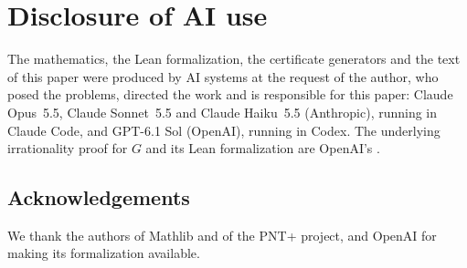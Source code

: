 \section*{Disclosure of AI use}

The mathematics, the Lean formalization, the certificate generators and the text of this paper were produced by AI systems at the request of the author, who posed the problems, directed the work and is responsible for this paper: Claude Opus~5.5, Claude Sonnet~5.5 and Claude Haiku~5.5 (Anthropic), running in Claude Code, and GPT-6.1 Sol (OpenAI), running in Codex. The underlying irrationality proof for $G$ and its Lean formalization are OpenAI's \cite{OpenAI2026}.

\subsection*{Acknowledgements}
We thank the authors of Mathlib and of the PNT+ project, and OpenAI for making its formalization available.
